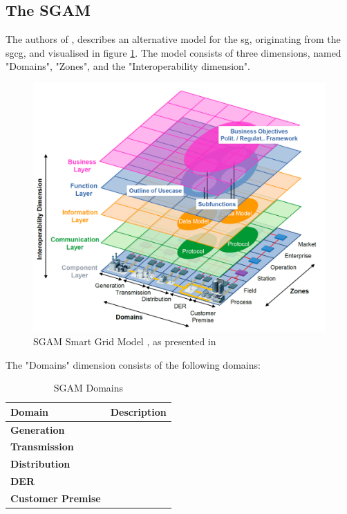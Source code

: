 \subsection{The SGAM}


The authors of \cite{uslar2019applying}, \citeauthor{uslar2019applying} describes an alternative model for the \acrshort{sg}, originating from the \acrfull{sgcg}, 
and visualised in figure \ref{fig:SGAM}. The model consists of three dimensions, named "Domains", "Zones", and the "Interoperability dimension". \\ 

\begin{figure}[t]
\includegraphics[width=\textwidth]{figures/SGAM.png}
\caption[SGAM Smart Grid Model]{SGAM Smart Grid Model , as presented in \cite{uslar2019applying}}
\label{fig:SGAM}
\end{figure}

The "Domains" dimension consists of the following domains:

\begin{table}[t]
    \centering
    \begin{tabular}{|p{2.8cm}|p{7cm}|} \hline
   
   
   \textbf{Domain} & \textbf{Description}  \\ \hline
  \textbf{Generation}   & \\ \hline
\textbf{Transmission}      & \\ \hline
\textbf{Distribution}      & \\ \hline
\textbf{DER}     & \\ \hline
\textbf{Customer Premise } & \\ \hline
        
    \end{tabular}
    \caption{SGAM Domains}
    \label{tab:SGAM-Domains}
\end{table}




